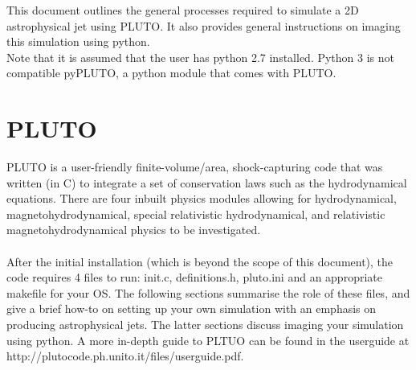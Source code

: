 \documentclass[12pt]{article}
\begin{document}
\maketitle

\noindent This document outlines the general processes required to simulate a 2D astrophysical jet using PLUTO. It also provides general instructions on imaging this simulation using python. \\
\newline
Note that it is assumed that the user has python 2.7 installed. Python 3 is not compatible pyPLUTO, a python module that comes with PLUTO.
\section{PLUTO}

PLUTO is a user-friendly finite-volume/area, shock-capturing code that was written (in C) to integrate a set of conservation laws such as the hydrodynamical equations. There are four inbuilt physics modules allowing for hydrodynamical, magnetohydrodynamical, special relativistic hydrodynamical, and relativistic magnetohydrodynamical physics to be investigated.\\
\\
After the initial installation (which is beyond the scope of this document), the code requires 4 files to run: init.c, definitions.h, pluto.ini and an appropriate makefile for your OS. The following sections summarise the role of these files, and give a brief how-to on setting up your own simulation with an emphasis on producing astrophysical jets. The latter sections discuss imaging your simulation using python. A more in-depth guide to PLTUO can be found in the userguide at http://plutocode.ph.unito.it/files/userguide.pdf.
\end{document}
